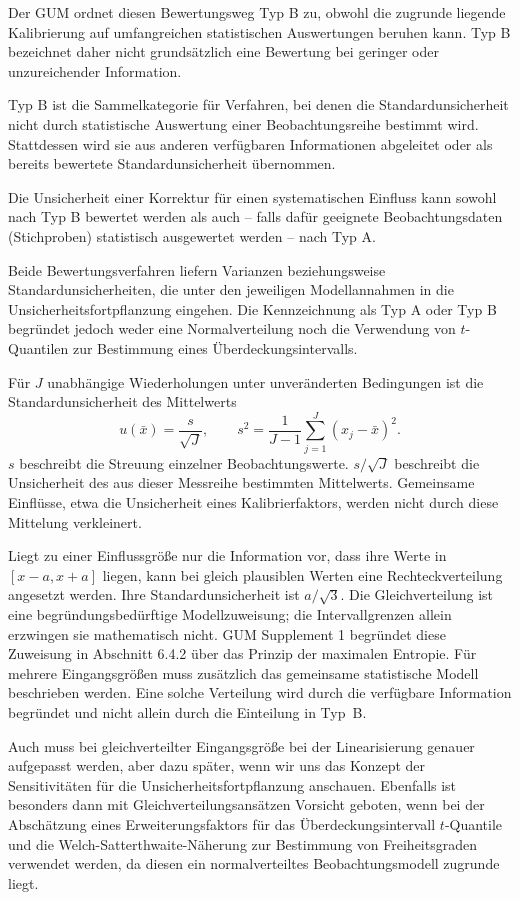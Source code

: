 Der GUM ordnet diesen Bewertungsweg Typ B zu, obwohl die zugrunde
liegende Kalibrierung auf umfangreichen statistischen Auswertungen
beruhen kann. Typ B bezeichnet daher nicht grundsätzlich eine
Bewertung bei geringer oder unzureichender Information.

Typ B ist die Sammelkategorie für Verfahren, bei denen die
Standardunsicherheit nicht durch statistische Auswertung einer
Beobachtungsreihe bestimmt wird. Stattdessen wird sie aus anderen
verfügbaren Informationen abgeleitet oder als bereits bewertete
Standardunsicherheit übernommen.

Die Unsicherheit einer Korrektur für einen
systematischen Einfluss kann sowohl nach Typ B bewertet werden als auch -- falls dafür geeignete Beobachtungsdaten (Stichproben) statistisch ausgewertet werden -- nach Typ A.

Beide Bewertungsverfahren liefern Varianzen beziehungsweise
Standardunsicherheiten, die unter den jeweiligen Modellannahmen
in die Unsicherheitsfortpflanzung eingehen. Die Kennzeichnung
als Typ A oder Typ B begründet jedoch weder eine Normalverteilung
noch die Verwendung von $t$-Quantilen zur Bestimmung eines
Überdeckungsintervalls.

Für $J$ unabhängige Wiederholungen unter unveränderten Bedingungen ist die
Standardunsicherheit des Mittelwerts
\begin{equation}
u(\bar x)=\frac{s}{\sqrt J},\qquad
s^2=\frac{1}{J-1}\sum_{j=1}^J(x_j-\bar x)^2.
\end{equation}
$s$ beschreibt die Streuung einzelner Beobachtungswerte. $s/\sqrt J$
beschreibt die Unsicherheit des aus dieser Messreihe bestimmten Mittelwerts.
Gemeinsame Einflüsse, etwa die Unsicherheit eines Kalibrierfaktors, werden
nicht durch diese Mittelung verkleinert.

Liegt zu einer Einflussgröße nur die Information vor, dass ihre Werte in
$[x-a,x+a]$ liegen, kann bei gleich plausiblen Werten eine Rechteckverteilung
angesetzt werden. Ihre Standardunsicherheit ist $a/\sqrt 3$. 
Die Gleichverteilung ist eine begründungsbedürftige Modellzuweisung; die Intervallgrenzen allein erzwingen sie mathematisch nicht. GUM Supplement 1 begründet diese Zuweisung in Abschnitt 6.4.2 über das Prinzip der maximalen Entropie. Für mehrere Eingangsgrößen muss zusätzlich das gemeinsame statistische Modell beschrieben werden. Eine solche Verteilung wird durch die verfügbare Information begründet und nicht allein durch die Einteilung in Typ~B.

Auch muss bei gleichverteilter Eingangsgröße bei der Linearisierung genauer aufgepasst werden, aber dazu später, wenn wir uns das Konzept der Sensitivitäten für die Unsicherheitsfortpflanzung anschauen. 
Ebenfalls ist besonders dann mit Gleichverteilungsansätzen Vorsicht geboten, wenn bei der Abschätzung eines Erweiterungsfaktors für das Überdeckungsintervall $t$-Quantile und die Welch-Satterthwaite-Näherung zur Bestimmung von Freiheitsgraden verwendet werden, da diesen ein normalverteiltes Beobachtungsmodell zugrunde liegt.


